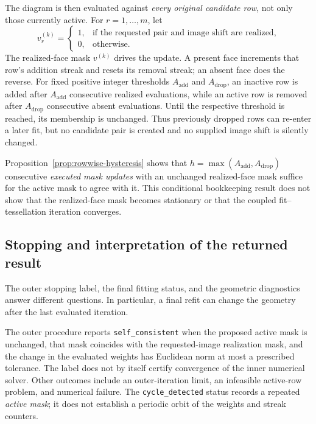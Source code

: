 The diagram is then evaluated against \emph{every original candidate row}, not only those currently active. For $r=1,\ldots,m$, let
\begin{equation}
v_r^{(k)}=
\begin{cases}
1,&\text{if the requested pair and image shift are realized},\\
0,&\text{otherwise}.
\end{cases}
\label{eq:realized-mask}
\end{equation}
The realized-face mask $v^{(k)}$ drives the update. A present face increments that row's addition streak and resets its removal streak; an absent face does the reverse. For fixed positive integer thresholds $A_{\mathrm{add}}$ and $A_{\mathrm{drop}}$, an inactive row is added after $A_{\mathrm{add}}$ consecutive realized evaluations, while an active row is removed after $A_{\mathrm{drop}}$ consecutive absent evaluations. Until the respective threshold is reached, its membership is unchanged. Thus previously dropped rows can re-enter a later fit, but no candidate pair is created and no supplied image shift is silently changed.

Proposition~\ref{prop:rowwise-hysteresis} shows that $h=\max(A_{\mathrm{add}},A_{\mathrm{drop}})$ consecutive \emph{executed mask updates} with an unchanged realized-face mask suffice for the active mask to agree with it. This conditional bookkeeping result does not show that the realized-face mask becomes stationary or that the coupled fit--tessellation iteration converges.

\subsection{Stopping and interpretation of the returned result}
\label{subsec:workflow-output}

The outer stopping label, the final fitting status, and the geometric diagnostics answer different questions. In particular, a final refit can change the geometry after the last evaluated iteration.

The outer procedure reports \texttt{self\_consistent} when the proposed active mask is unchanged, that mask coincides with the requested-image realization mask, and the change in the evaluated weights has Euclidean norm at most a prescribed tolerance. The label does not by itself certify convergence of the inner numerical solver. Other outcomes include an outer-iteration limit, an infeasible active-row problem, and numerical failure. The \texttt{cycle\_detected} status records a repeated \emph{active mask}; it does not establish a periodic orbit of the weights and streak counters.


